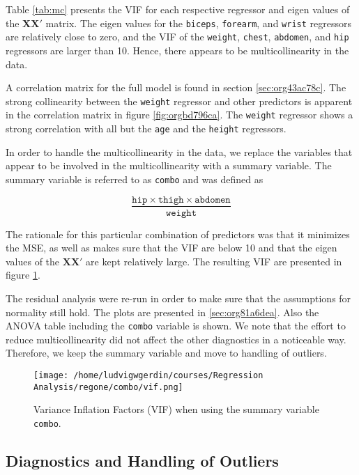 \documentclass[11pt]{article}
\begin{document}
Table \ref{tab:mc} presents the VIF for each respective regressor and eigen values of the
\(\textbf{X}\textbf{X}'\) matrix. The eigen values for the 
\texttt{biceps}, \texttt{forearm}, and \texttt{wrist} regressors are relatively close to zero, and the
VIF of the \texttt{weight}, \texttt{chest}, \texttt{abdomen}, and \texttt{hip} regressors are larger than 10.
Hence, there appears to be multicollinearity in the data.

A correlation matrix for the full model is found in section \ref{sec:org43ac78c}. The strong collinearity
between the \texttt{weight} regressor and other predictors is apparent in the correlation matrix in figure
\ref{fig:orgbd796ca}. The \texttt{weight} regressor shows a strong correlation with all but the \texttt{age} and
the \texttt{height} regressors.

In order to handle the multicollinearity in the data, we replace the variables that appear to be involved 
in the multicollinearity with a summary variable. \cite{Montgomery2012} The summary variable is referred to as
\texttt{combo} and was defined as

\[
   \frac{\texttt{hip}\times\texttt{thigh}\times\texttt{abdomen}}{\texttt{weight}}   
   \]

The rationale for this particular combination of predictors was that it minimizes the MSE, as well as makes sure
that the VIF are below 10 and that the eigen values of the \(\textbf{X}\textbf{X}'\) are kept relatively 
large. The resulting VIF are presented in figure \ref{fig:org412cb63}. 

The residual analysis were re-run in order to make sure that the assumptions for normality still hold.
The plots are presented in \ref{sec:org81a6dea}. Also the ANOVA table including the \texttt{combo} variable 
is shown. We note that the effort to reduce multicollinearity did not affect the
other diagnostics in a noticeable way. Therefore, we keep the summary variable and move to handling of outliers.

 

\begin{figure}[htbp]
\centering
\texttt{[image: /home/ludvigwgerdin/courses/Regression Analysis/regone/combo/vif.png]}
\caption{\label{fig:org412cb63}
Variance Inflation Factors (VIF) when using the summary variable \texttt{combo}.}
\end{figure}   


\subsection{Diagnostics and Handling of Outliers}
\label{sec:org961a018}
\end{document}
